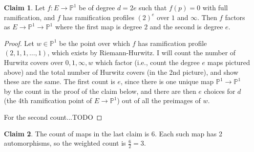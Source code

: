 \documentclass[11pt]{article}           %
\renewcommand{\P}{\mathbb P}
\theoremstyle{definition}
\newtheorem*{claim}{Claim}
\theoremstyle{definition}
\begin{document}
\begin{claim}
  Let $f:E\to\P^1$ be of degree $d=2e$ such that $f(p)=0$ with full ramification,
  and $f$ has ramification profiles $(2)^e$ over $1$ and $\infty$. Then $f$ factors as
  $E\to\P^1\to\P^1$ where the first map is degree $2$ and the second is degree $e$.
\end{claim}
\begin{proof}
  Let $w\in\P^1$ be the point over which $f$ has ramification profile $(2,1,1,\dots,1)$, which exists by Riemann-Hurwitz. I will
  count the number of Hurwitz covers over $0,1,\infty,w$ which factor (i.e., count the degree $e$ maps pictured above) and the
  total number of Hurwitz covers (in the 2nd picture), and show these are the same. The first
  count is $e$, since there is one unique map $\P^1\to\P^1$ by the count in the proof of the claim below, and there are then $e$ choices
  for $d$ (the 4th ramification point of $E\to\P^1$) out of all the preimages of $w$.

  For the second count...TODO
\end{proof}
\begin{claim}
  The count of maps in the last claim is $6$. Each such map has 2 automorphisms, so the weighted count is $\frac 62=3$.
\end{claim}
\end{document}
